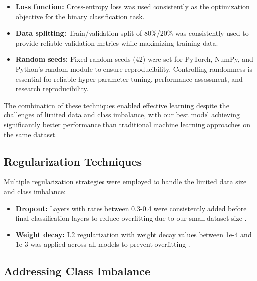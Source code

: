 \documentclass[a4paper,12pt]{report}
\begin{document}
\begin{itemize}

    \item \textbf{Loss function:} Cross-entropy loss was used consistently as the optimization objective for the binary classification task.
    
    \item \textbf{Data splitting:} Train/validation split of 80\%/20\% was consistently used to provide reliable validation metrics while maximizing training data.
    
    \item \textbf{Random seeds:} Fixed random seeds (42) were set for PyTorch, NumPy, and Python's random module to ensure reproducibility. Controlling randomness is essential for reliable hyper-parameter tuning, performance assessment, and research reproducibility.

\end{itemize}

The combination of these techniques enabled effective learning despite the challenges of limited data and class imbalance, with our best model achieving significantly better performance than traditional machine learning approaches on the same dataset.

\subsection{Regularization Techniques}

Multiple regularization strategies were employed to handle the limited data size and class imbalance:

\begin{itemize}
    \item \textbf{Dropout:} Layers with rates between 0.3-0.4 were consistently added before final classification layers to reduce overfitting due to our small dataset size \citep{srivastava2014dropout}.
    \item \textbf{Weight decay:} L2 regularization with weight decay values between 1e-4 and 1e-3 was applied across all models to prevent overfitting \citep{krogh1992simple}.
    

\end{itemize}

\subsection{Addressing Class Imbalance}
\end{document}
